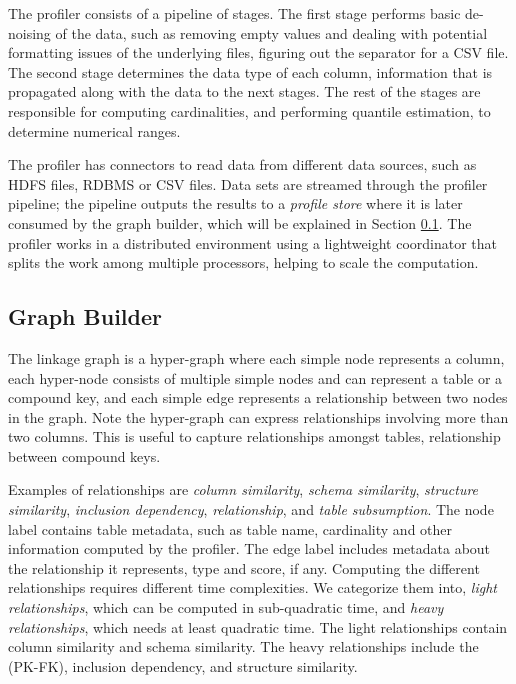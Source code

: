 The profiler consists of a pipeline of stages. The first stage
performs basic de-noising of the data, such as removing empty values and dealing
with potential formatting issues of the underlying files, \eg figuring out the
separator for a CSV file.  The second stage determines the data type of each
column, information that is propagated along with the data to the next stages.
The rest of the stages are responsible for computing cardinalities, and performing
quantile estimation, \eg to determine numerical ranges.

The profiler has connectors to read data from different data sources, such as
HDFS files, RDBMS or CSV files. Data sets are streamed through the profiler
pipeline;  the pipeline outputs the results
to a {\it profile store} where it is later consumed by the graph builder, which
will be explained in Section \ref{subsec:graphbuild}.
The profiler works in a distributed environment using a lightweight coordinator
that splits the work among multiple processors, helping to scale the
computation.



\subsection{Graph Builder}
\label{subsec:graphbuild}

The linkage graph is a hyper-graph where each simple node represents a column, each hyper-node consists of multiple simple nodes and can represent a table or a compound key, and each simple edge represents a relationship between two nodes in the graph. Note the hyper-graph can express relationships involving more than two columns. This is useful to capture relationships amongst tables, \eg \pkfk relationship between compound keys.

Examples of relationships are 
\emph{column similarity}, 
\emph{schema similarity}, 
\emph{structure similarity}, %
\emph{inclusion dependency}, 
\emph{\pkfk relationship}, and
\emph{table subsumption}. 
The node label contains table metadata, such as table name, cardinality and
other information computed by the profiler. The edge label includes metadata
about the relationship it represents, \eg type and score, if any. Computing
the different relationships requires different time complexities. We 
categorize them into, \textit{light relationships}, which can be computed in
sub-quadratic time, and \textit{heavy relationships}, which needs at least
quadratic time. The light relationships contain column similarity and schema
similarity. The heavy relationships include the \pkfk (PK-FK), inclusion dependency, and structure similarity. 


